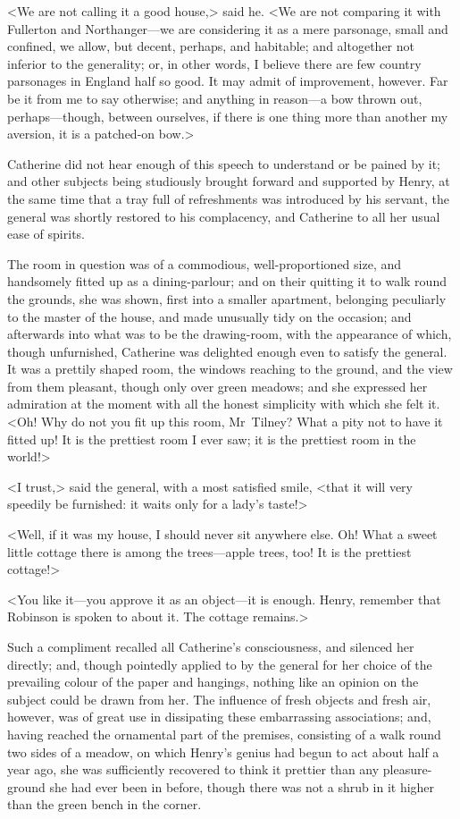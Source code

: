  <We are not calling it a good house,> said he. <We are not comparing it with Fullerton and Northanger—we are considering it as a mere parsonage, small and confined, we allow, but decent, perhaps, and habitable; and altogether not inferior to the generality; or, in other words, I believe there are few country parsonages in England half so good. It may admit of improvement, however. Far be it from me to say otherwise; and anything in reason—a bow thrown out, perhaps—though, between ourselves, if there is one thing more than another my aversion, it is a patched-on bow.> 

 Catherine did not hear enough of this speech to understand or be pained by it; and other subjects being studiously brought forward and supported by Henry, at the same time that a tray full of refreshments was introduced by his servant, the general was shortly restored to his complacency, and Catherine to all her usual ease of spirits. 

 The room in question was of a commodious, well-proportioned size, and handsomely fitted up as a dining-parlour; and on their quitting it to walk round the grounds, she was shown, first into a smaller apartment, belonging peculiarly to the master of the house, and made unusually tidy on the occasion; and afterwards into what was to be the drawing-room, with the appearance of which, though unfurnished, Catherine was delighted enough even to satisfy the general. It was a prettily shaped room, the windows reaching to the ground, and the view from them pleasant, though only over green meadows; and she expressed her admiration at the moment with all the honest simplicity with which she felt it. <Oh! Why do not you fit up this room, Mr~Tilney? What a pity not to have it fitted up! It is the prettiest room I ever saw; it is the prettiest room in the world!> 

 <I trust,> said the general, with a most satisfied smile, <that it will very speedily be furnished: it waits only for a lady's taste!> 

 <Well, if it was my house, I should never sit anywhere else. Oh! What a sweet little cottage there is among the trees—apple trees, too! It is the prettiest cottage!> 

 <You like it—you approve it as an object—it is enough. Henry, remember that Robinson is spoken to about it. The cottage remains.> 

 Such a compliment recalled all Catherine's consciousness, and silenced her directly; and, though pointedly applied to by the general for her choice of the prevailing colour of the paper and hangings, nothing like an opinion on the subject could be drawn from her. The influence of fresh objects and fresh air, however, was of great use in dissipating these embarrassing associations; and, having reached the ornamental part of the premises, consisting of a walk round two sides of a meadow, on which Henry's genius had begun to act about half a year ago, she was sufficiently recovered to think it prettier than any pleasure-ground she had ever been in before, though there was not a shrub in it higher than the green bench in the corner. 

